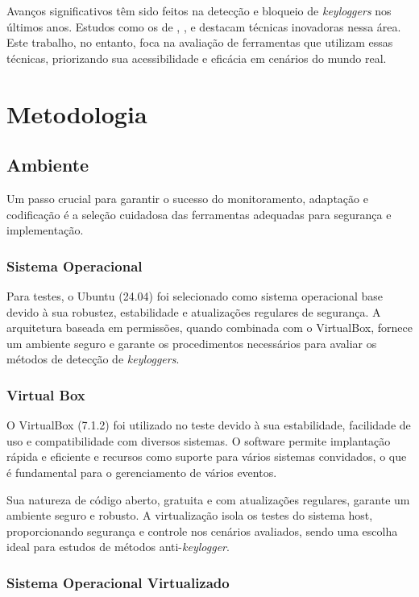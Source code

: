 \documentclass[12pt]{article}
\begin{document}
Avanços significativos têm sido feitos na detecção e bloqueio de \textit{keyloggers} nos últimos anos. Estudos como os de \citep{singh2021keylogger}, \citep{wajahat2019novel}, \citep{solairaj2016keyloggers} e \citep{aslan2020comprehensive} destacam técnicas inovadoras nessa área. Este trabalho, no entanto, foca na avaliação de ferramentas que utilizam essas técnicas, priorizando sua acessibilidade e eficácia em cenários do mundo real.

\section{Metodologia}
\subsection{Ambiente}
Um passo crucial para garantir o sucesso do monitoramento, adaptação e codificação é a seleção cuidadosa das ferramentas adequadas para segurança e implementação.

\subsubsection{Sistema Operacional}
Para testes, o Ubuntu (24.04) foi selecionado como sistema operacional base devido à sua robustez, estabilidade e atualizações regulares de segurança. A arquitetura baseada em permissões, quando combinada com o VirtualBox, fornece um ambiente seguro e garante os procedimentos necessários para avaliar os métodos de detecção de \textit{keyloggers}.

\subsubsection{Virtual Box}
O VirtualBox (7.1.2) foi utilizado no teste devido à sua estabilidade, facilidade de uso e compatibilidade com diversos sistemas. O software permite implantação rápida e eficiente e recursos como suporte para vários sistemas convidados, o que é fundamental para o gerenciamento de vários eventos.

Sua natureza de código aberto, gratuita e com atualizações regulares, garante um ambiente seguro e robusto. A virtualização isola os testes do sistema host, proporcionando segurança e controle nos cenários avaliados, sendo uma escolha ideal para estudos de métodos anti-\textit{keylogger}.

\subsubsection{Sistema Operacional Virtualizado}
\end{document}
